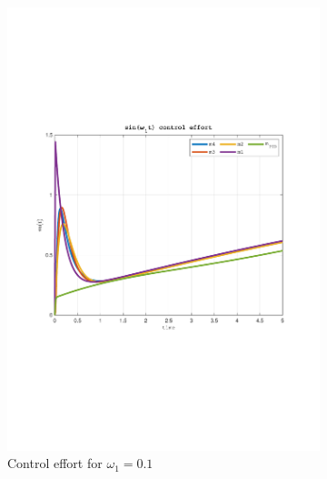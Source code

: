 \documentclass[a4paper, 12pt]{article}
\begin{document}
\begin{figure}[h!]
\begin{subfigure}[t]{0.4\textwidth}
           \includegraphics[width=\textwidth]{Figures/fig07b.pdf}
           \caption{Control effort for $\omega_1 = 0.1$}
           \label{fig:fig07b}
       \end{subfigure}
\begin{subfigure}[t]{0.60\textwidth}

\end{subfigure}
\end{figure}
\end{document}
